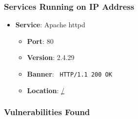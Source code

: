 \documentclass{article}
\begin{document}
\subsubsection*{Services Running on IP Address}

\begin{itemize}
    
        \item \textbf{Service}: Apache httpd
        \begin{itemize}
            \item \textbf{Port}: 80
            \item \textbf{Version}:  2.4.29 
            \item \textbf{Banner}: \texttt{
                HTTP/1.1 200 OK
            }
            \item \textbf{Location}: \href{ / }{ / }
        \end{itemize}
    
\end{itemize}


\subsubsection*{Vulnerabilities Found}
\end{document}
